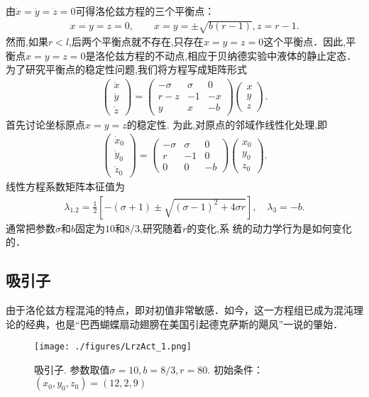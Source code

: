 由$\dot{x}=\dot{y}=\dot{z}=0$可得洛伦兹方程的三个平衡点：
\begin{align}
x=y=z=0,\qquad x=y=\pm\sqrt{b(r-1)}, z=r-1.
\end{align}
然而,如果$r<l$,后两个平衡点就不存在,只存在$x=y=z=0$这个平衡点．因此,平衡点$x=y=z=0$是洛伦兹方程的不动点,相应于贝纳德实验中液体的静止定态．为了研究平衡点的稳定性问题,我们将方程写成矩阵形式
\begin{align}
\left(\begin{array}{l}
\dot{x} \\
\dot{y} \\
\dot{z}
\end{array}\right)=\left(\begin{array}{ccc}
-\sigma & \sigma & 0 \\
r-z & -1 & -x \\
y & x & -b
\end{array}\right)\left(\begin{array}{l}
x \\
y \\
z
\end{array}\right) .
\end{align}
首先讨论坐标原点$x=y=z$的稳定性. 为此,对原点的邻域作线性化处理,即
\begin{align}
\left(\begin{array}{l}
\dot{x}_{0} \\
\dot{y}_{0} \\
\dot{z}_{0}
\end{array}\right)=\left(\begin{array}{ccc}
-\sigma & \sigma & 0 \\
r & -1 & 0 \\
0 & 0 & -b
\end{array}\right)\left(\begin{array}{l}
x_{0} \\
y_{0} \\
z_{0}
\end{array}\right).
\end{align}
线性方程系数矩阵本征值为
\begin{align}
\lambda_{1.2}=\frac{1}{2}\left[-(\sigma+1) \pm \sqrt{(\sigma-1)^{2}+4 \sigma r}\right], \quad \lambda_{3}=-b.
\end{align}
通常把参数$\sigma$和$b$固定为$10$和$8/3$,研究随着$r$的变化,系
统的动力学行为是如何变化的．

\subsection{吸引子}
由于洛伦兹方程混沌的特点，即对初值非常敏感．如今，这一方程组已成为混沌理论的经典，也是“巴西蝴蝶扇动翅膀在美国引起德克萨斯的飓风”一说的肇始．
\begin{figure}[ht]
\centering
\texttt{[image: ./figures/LrzAct\_1.png]}
\caption{吸引子. 参数取值$\sigma=10,b=8/3, r=80$. 初始条件： $(x_0,y_0,z_0)=(12,2,9)$} \label{LrzAct_fig1}
\end{figure}


